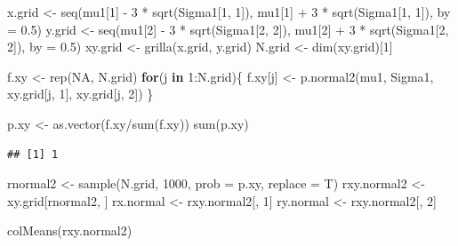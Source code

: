 \documentclass[
  10pt,
  spanish,
]{book}
\newenvironment{Shaded}{\begin{snugshade}}{\end{snugshade}}
\newcommand{\AttributeTok}[1]{\textcolor[rgb]{0.77,0.63,0.00}{#1}}
\newcommand{\ConstantTok}[1]{\textcolor[rgb]{0.00,0.00,0.00}{#1}}
\newcommand{\ControlFlowTok}[1]{\textcolor[rgb]{0.13,0.29,0.53}{\textbf{#1}}}
\newcommand{\DecValTok}[1]{\textcolor[rgb]{0.00,0.00,0.81}{#1}}
\newcommand{\FloatTok}[1]{\textcolor[rgb]{0.00,0.00,0.81}{#1}}
\newcommand{\FunctionTok}[1]{\textcolor[rgb]{0.00,0.00,0.00}{#1}}
\newcommand{\NormalTok}[1]{#1}
\newcommand{\OtherTok}[1]{\textcolor[rgb]{0.56,0.35,0.01}{#1}}
\newcommand{\SpecialCharTok}[1]{\textcolor[rgb]{0.00,0.00,0.00}{#1}}
\theoremstyle{definition}
\theoremstyle{definition}
\theoremstyle{definition}
\theoremstyle{definition}
\theoremstyle{remark}
\begin{document}
\begin{Shaded}
\begin{Highlighting}[]
\NormalTok{x.grid }\OtherTok{\textless{}{-}} \FunctionTok{seq}\NormalTok{(mu1[}\DecValTok{1}\NormalTok{] }\SpecialCharTok{{-}} \DecValTok{3} \SpecialCharTok{*} \FunctionTok{sqrt}\NormalTok{(Sigma1[}\DecValTok{1}\NormalTok{, }\DecValTok{1}\NormalTok{]),}
\NormalTok{              mu1[}\DecValTok{1}\NormalTok{] }\SpecialCharTok{+} \DecValTok{3} \SpecialCharTok{*} \FunctionTok{sqrt}\NormalTok{(Sigma1[}\DecValTok{1}\NormalTok{, }\DecValTok{1}\NormalTok{]),}
              \AttributeTok{by =} \FloatTok{0.5}\NormalTok{)}
\NormalTok{y.grid }\OtherTok{\textless{}{-}} \FunctionTok{seq}\NormalTok{(mu1[}\DecValTok{2}\NormalTok{] }\SpecialCharTok{{-}} \DecValTok{3} \SpecialCharTok{*} \FunctionTok{sqrt}\NormalTok{(Sigma1[}\DecValTok{2}\NormalTok{, }\DecValTok{2}\NormalTok{]),}
\NormalTok{              mu1[}\DecValTok{2}\NormalTok{] }\SpecialCharTok{+} \DecValTok{3} \SpecialCharTok{*} \FunctionTok{sqrt}\NormalTok{(Sigma1[}\DecValTok{2}\NormalTok{, }\DecValTok{2}\NormalTok{]),}
              \AttributeTok{by =} \FloatTok{0.5}\NormalTok{)}
\NormalTok{xy.grid }\OtherTok{\textless{}{-}} \FunctionTok{grilla}\NormalTok{(x.grid, y.grid)}
\NormalTok{N.grid }\OtherTok{\textless{}{-}} \FunctionTok{dim}\NormalTok{(xy.grid)[}\DecValTok{1}\NormalTok{]}

\NormalTok{f.xy }\OtherTok{\textless{}{-}} \FunctionTok{rep}\NormalTok{(}\ConstantTok{NA}\NormalTok{, N.grid)}
\ControlFlowTok{for}\NormalTok{(j }\ControlFlowTok{in} \DecValTok{1}\SpecialCharTok{:}\NormalTok{N.grid)\{}
\NormalTok{  f.xy[j] }\OtherTok{\textless{}{-}} \FunctionTok{p.normal2}\NormalTok{(mu1, Sigma1, }
\NormalTok{                       xy.grid[j, }\DecValTok{1}\NormalTok{], }
\NormalTok{                       xy.grid[j, }\DecValTok{2}\NormalTok{])}
\NormalTok{\}}

\NormalTok{p.xy }\OtherTok{\textless{}{-}} \FunctionTok{as.vector}\NormalTok{(f.xy}\SpecialCharTok{/}\FunctionTok{sum}\NormalTok{(f.xy))}
\FunctionTok{sum}\NormalTok{(p.xy)}
\end{Highlighting}
\end{Shaded}

\begin{verbatim}
## [1] 1
\end{verbatim}

\begin{Shaded}
\begin{Highlighting}[]
\NormalTok{rnormal2 }\OtherTok{\textless{}{-}} \FunctionTok{sample}\NormalTok{(N.grid, }\DecValTok{1000}\NormalTok{, }\AttributeTok{prob =}\NormalTok{ p.xy, }\AttributeTok{replace =}\NormalTok{ T)}
\NormalTok{rxy.normal2 }\OtherTok{\textless{}{-}}\NormalTok{ xy.grid[rnormal2, ]}
\NormalTok{rx.normal }\OtherTok{\textless{}{-}}\NormalTok{ rxy.normal2[, }\DecValTok{1}\NormalTok{]}
\NormalTok{ry.normal }\OtherTok{\textless{}{-}}\NormalTok{ rxy.normal2[, }\DecValTok{2}\NormalTok{]}

\FunctionTok{colMeans}\NormalTok{(rxy.normal2)}
\end{Highlighting}
\end{Shaded}
\end{document}

